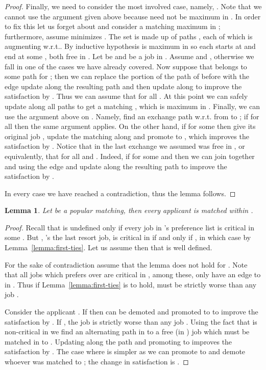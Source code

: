 \documentclass[11pt]{article}
\newcommand{\wrt}{{w.r.t.}\xspace}
\newtheorem{lemma}{Lemma}
\begin{document}
{\begin{proof}
Finally, we need to consider the most involved case, namely, . Note that we cannot use the argument given above because  need not be maximum in . In order to fix this let us forget about  and consider a matching  maximum in ; furthermore, assume  minimizes . The set  is made up of paths , each of which is augmenting \wrt . By inductive hypothesis  is maximum in  so each  starts at  and end at some , both free in . Let  be  and  be a job in . Assume  and , otherwise we fall in one of the cases we have already covered. Now suppose that  belongs to some path  for ; then we can replace the portion of the path of  before  with the edge  update  along the resulting path and then update along  to improve the satisfaction by . Thus we can assume that  for all . At this point we can safely update  along all paths  to get a matching , which is maximum in . Finally, we can use the argument above on . Namely, find an exchange path  \wrt  from  to ; if  for all  then the same argument applies. On the other hand, if  for some  then give  its original job , update the matching along  and promote  to , which improves the satisfaction by . Notice that in the last exchange we assumed  was free in , or equivalently, that  for all  and . Indeed, if  for some  and  then we can join together  and  using the edge  and update  along the resulting path to improve the satisfaction by .

In every case we have reached a contradiction, thus the lemma follows.
\end{proof}

\begin{lemma} \label{lemma:second-ties} Let  be a popular matching, then every applicant  is matched within .
\end{lemma}

\begin{proof} Recall that  is undefined only if every job in 's preference list is critical in some . But , 's the last resort job, is critical in  if and only if , in which case  by Lemma~\ref{lemma:first-ties}. Let us assume then that  is well defined.

For the sake of contradiction assume that the lemma does not hold for . Note that all jobs which  prefers over  are critical in , among these, only  have an edge to  in . Thus if Lemma~\ref{lemma:first-ties} is to hold,  must be strictly worse than any job .

Consider the applicant . If  then  can be demoted and  promoted to  to improve the satisfaction by . If , the job  is strictly worse than any job . Using the fact that  is non-critical in  we find an alternating path in  to a free (in ) job  which must be matched in  to . Updating along the path and promoting  to  improves the satisfaction by . The case where  is simpler as we can promote  to  and demote whoever was matched to ; the change in satisfaction is .
\end{proof}

}
\end{document}
